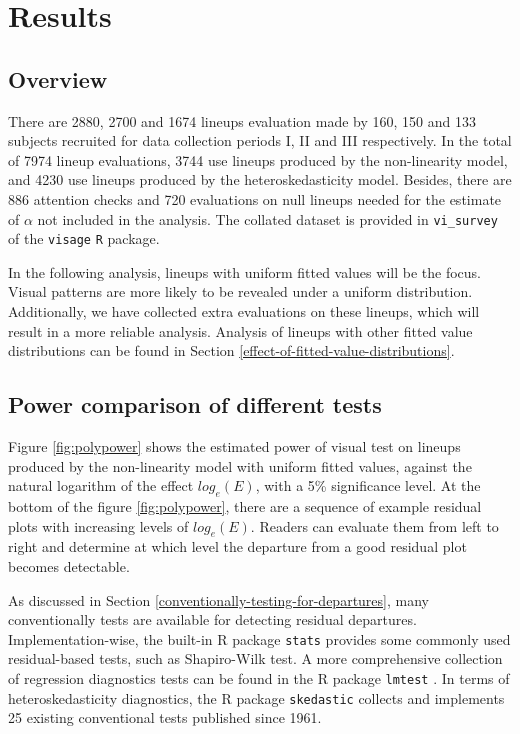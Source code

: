 \documentclass[]{interact}
\theoremstyle{plain}%
\theoremstyle{definition}
\theoremstyle{remark}
\begin{document}
\hypertarget{results}{%
\section{Results}\label{results}}

\hypertarget{overview}{%
\subsection{Overview}\label{overview}}

There are 2880, 2700 and 1674 lineups evaluation made by 160, 150 and
133 subjects recruited for data collection periods I, II and III
respectively. In the total of 7974 lineup evaluations, 3744 use lineups
produced by the non-linearity model, and 4230 use lineups produced by
the heteroskedasticity model. Besides, there are 886 attention checks
and 720 evaluations on null lineups needed for the estimate of
\(\alpha\) not included in the analysis. The collated dataset is
provided in \texttt{vi\_survey} of the \texttt{visage} \texttt{R}
package.

In the following analysis, lineups with uniform fitted values will be
the focus. Visual patterns are more likely to be revealed under a
uniform distribution. Additionally, we have collected extra evaluations
on these lineups, which will result in a more reliable analysis.
Analysis of lineups with other fitted value distributions can be found
in Section \ref{effect-of-fitted-value-distributions}.

\hypertarget{power-comparison-of-different-tests}{%
\subsection{Power comparison of different
tests}\label{power-comparison-of-different-tests}}

Figure \ref{fig:polypower} shows the estimated power of visual test on
lineups produced by the non-linearity model with uniform fitted values,
against the natural logarithm of the effect \(log_e(E)\), with a 5\%
significance level. At the bottom of the figure \ref{fig:polypower},
there are a sequence of example residual plots with increasing levels of
\(log_e(E)\). Readers can evaluate them from left to right and determine
at which level the departure from a good residual plot becomes
detectable.

As discussed in Section \ref{conventionally-testing-for-departures},
many conventionally tests are available for detecting residual
departures. Implementation-wise, the built-in R package \texttt{stats}
provides some commonly used residual-based tests, such as Shapiro-Wilk
test. A more comprehensive collection of regression diagnostics tests
can be found in the R package \texttt{lmtest} \citep{lmtest}. In terms
of heteroskedasticity diagnostics, the R package \texttt{skedastic}
\citep{skedastic} collects and implements 25 existing conventional tests
published since 1961.
\end{document}
